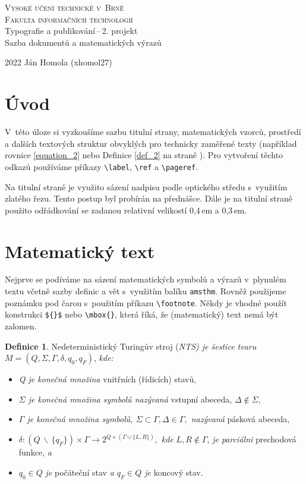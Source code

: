 \documentclass[a4paper, 11pt, twocolumn]{article}
\theoremstyle{definition}
\newtheorem{definition}{Definice}
\begin{document}
\begin{titlepage}
\begin{center}
    \Huge
    \textsc{{\Huge Vysoké učení technické v~Brně}\\
            {\huge Fakulta informačních technologií}}\\
    {\LARGE Typografie a publikování\,--\,2. projekt\\
    Sazba dokumentů a matematických výrazů}
\end{center}
{\Large 2022 \hfill Ján Homola (xhomol27)}
\end{titlepage}
    


\section*{Úvod}
V~této úloze si vyzkoušíme sazbu titulní strany, matematických vzorců, prostředí a dalších textových struktur obvyklých pro technicky zaměřené texty (například rovnice \eqref{equation_2} nebo Definice \ref{def_2} na straně \pageref{def_2}). Pro vytvoření těchto odkazů používáme příkazy \verb|\label|, \verb|\ref| a \verb|\pageref|. \par
Na titulní straně je využito sázení nadpisu podle optického středu s~využitím zlatého řezu. Tento postup byl probírán na přednášce. Dále je na titulní straně použito odřádkování se zadanou relativní velikostí 0,4\,em a 0,3\,em.

\section{Matematický text}
Nejprve se podíváme na sázení matematických symbolů a výrazů v~plynulém textu včetně sazby definic a vět s~využitím balíku \texttt{amsthm}. Rovněž použijeme poznámku pod čarou s~použitím příkazu \verb|\footnote|. Někdy je vhodné použít konstrukci \verb|${}$| nebo \verb|\mbox{}|, která říká, že (matematický) text nemá být zalomen. 

\begin{definition}
\label{def_1}
Nedeterministický Turingův stroj (\emph{NTS) je šestice tvaru} $M = (Q, \Sigma, \Gamma, \delta, q_0, q_F)$, \emph{kde:}
\begin{itemize}
    \item \emph{Q je konečná množina} vnitřních (řídicích) stavů, 
    \item \emph{$\Sigma$ je konečná množina symbolů nazývaná} vstupní abeceda, $\Delta \notin \Sigma,$
    \item \emph{$\Gamma$ je konečná množina symbolů, $\Sigma \subset \Gamma, \Delta \in \Gamma,$ nazývaná} pásková abeceda,
    \item  $\delta:(Q \,\backslash \,\{q_F\}) \times \Gamma \rightarrow 2^{Q \times(\Gamma \cup\{L, R\})},$ \emph{kde} $L, R \notin \Gamma$, \emph{je parciálni} prechodová funkce, \emph{a}
    \item $q_0 \in Q$ \emph{je} počáteční stav \emph{a $q_F \in Q$ je} koncový stav.
\end{itemize}
\end{definition}
\end{document}
